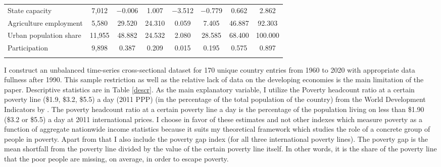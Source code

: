 \documentclass[a4paper, 12pt]{article}
\begin{document}
\begin{table}[!htbp]
{\begin{tabular}{@{\extracolsep{5pt}}lccccccc}
State capacity & 7,012 & $-$0.006 & 1.007 & $-$3.512 & $-$0.779 & 0.662 & 2.862 \\ 
Agriculture employment & 5,580 & 29.520 & 24.310 & 0.059 & 7.405 & 46.887 & 92.303 \\ 
Urban population share & 11,955 & 48.882 & 24.532 & 2.080 & 28.585 & 68.400 & 100.000 \\ 
Participation & 9,898 & 0.387 & 0.209 & 0.015 & 0.195 & 0.575 & 0.897 \\ 
\hline \\[-1.8ex] 
\end{tabular} 
}
\end{table}

	
	
	\noindent I construct an unbalanced time-series cross-sectional dataset for 170 unique country entries from 1960 to 2020 with appropriate data fullness after 1990. This sample restriction as well as the relative lack of data on the developing economies is the main limitation of the paper. Descriptive statistics are in Table \ref{descr}. As the main explanatory variable, I utilize the Poverty headcount ratio at a certain poverty line (\$1.9, \$3.2, \$5.5) a day (2011 PPP) (in the percentage of the total population of the country) from the World Development Indicators by  \cite{worldbank}. The poverty headcount ratio at a certain poverty line a day is the percentage of the population living on less than \$1.90 (\$3.2 or \$5.5) a day at 2011 international prices. I choose in favor of these estimates and not other indexes which measure poverty as a function of aggregate nationwide income statistics because it suits my theoretical framework which studies the role of a concrete group of people in poverty. Apart from that I also include the poverty gap index (for all three international poverty lines). The poverty gap is the mean shortfall from the poverty line divided by the value of the certain poverty line itself. In other words, it is the share of the poverty line that the poor people are missing, on average, in order to escape poverty.
    \\\\
\end{document}
